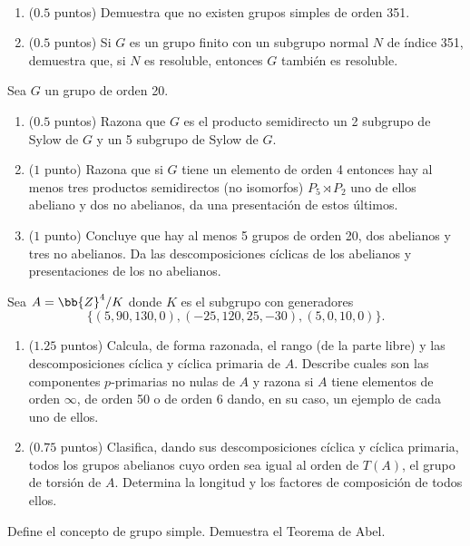 \documentclass[12pt]{article}
\begin{document}
    \begin{ejercicio}[$1$ punto]~
        \begin{enumerate}[label=\alph*)]
            \item ($0.5$ puntos) Demuestra que no existen grupos simples de orden 351.
            \item ($0.5$ puntos) Si $G$ es un grupo finito con un subgrupo normal $N$ de índice 351, demuestra que, si $N$ es resoluble, entonces $G$ también es resoluble.
        \end{enumerate}
    \end{ejercicio}

    \begin{ejercicio}[$2.5$ puntos]
        Sea $G$ un grupo de orden 20.
        
        \begin{enumerate}[label=\alph*)]
            \item ($0.5$ puntos) Razona que $G$ es el producto semidirecto un 2 subgrupo de Sylow de $G$ y un 5 subgrupo de Sylow de $G$.
            \item ($1$ punto) Razona que si $G$ tiene un elemento de orden 4 entonces hay al menos tres productos semidirectos (no isomorfos) $P_5 \rtimes P_2$ uno de ellos abeliano y dos no abelianos, da una presentación de estos últimos.
            \item ($1$ punto) Concluye que hay al menos 5 grupos de orden 20, dos abelianos y tres no abelianos. Da las descomposiciones cíclicas de los abelianos y presentaciones de los no abelianos.
        \end{enumerate}
    \end{ejercicio}

    \begin{ejercicio}[$2$ puntos]
        Sea $A = \bb{Z}^4/K$ donde $K$ es el subgrupo con generadores
        \[ \{(5, 90, 130, 0), (-25, 120, 25, -30), (5, 0, 10, 0)\}. \]
        
        \begin{enumerate}[label=\alph*)]
            \item ($1.25$ puntos) Calcula, de forma razonada, el rango (de la parte libre) y las descomposiciones cíclica y cíclica primaria de $A$. Describe cuales son las componentes $p$-primarias no nulas de $A$ y razona si $A$ tiene elementos de orden $\infty$, de orden 50 o de orden 6 dando, en su caso, un ejemplo de cada uno de ellos.
            \item ($0.75$ puntos) Clasifica, dando sus descomposiciones cíclica y cíclica primaria, todos los grupos abelianos cuyo orden sea igual al orden de $T(A)$, el grupo de torsión de $A$. Determina la longitud y los factores de composición de todos ellos.
        \end{enumerate}
    \end{ejercicio}

    \begin{ejercicio}[$2$ puntos]
        Define el concepto de grupo simple. Demuestra el Teorema de Abel.
    \end{ejercicio}

    \newpage
    \setcounter{ejercicio}{0} %
    \noindent
\end{document}
